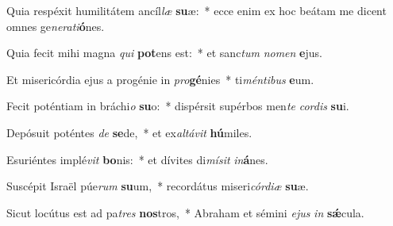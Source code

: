 \item Quia respéxit humilitátem ancíl\textit{læ} \textbf{su}æ:~* ecce enim ex hoc beátam me dicent omnes ge\textit{ne}\textit{ra}\textit{ti}\textbf{ó}nes.
\item Quia fecit mihi magna \textit{qui} \textbf{pot}ens est:~* et sanc\textit{tum} \textit{no}\textit{men} \textbf{e}jus.
\item Et misericórdia ejus a progénie in \textit{pro}\textbf{gé}nies~* ti\textit{mén}\textit{ti}\textit{bus} \textbf{e}um.
\item Fecit poténtiam in bráchi\textit{o} \textbf{su}o:~* dispérsit supérbos men\textit{te} \textit{cor}\textit{dis} \textbf{su}i.
\item Depósuit poténtes \textit{de} \textbf{se}de,~* et ex\textit{al}\textit{tá}\textit{vit} \textbf{hú}miles.
\item Esuriéntes implé\textit{vit} \textbf{bo}nis:~* et dívites di\textit{mí}\textit{sit} \textit{in}\textbf{á}nes.
\item Suscépit Israël púe\textit{rum} \textbf{su}um,~* recordátus miseri\textit{cór}\textit{di}\textit{æ} \textbf{su}æ.
\item Sicut locútus est ad pa\textit{tres} \textbf{nos}tros,~* Abraham et sémini \textit{e}\textit{jus} \textit{in} \textbf{sǽ}cula.
